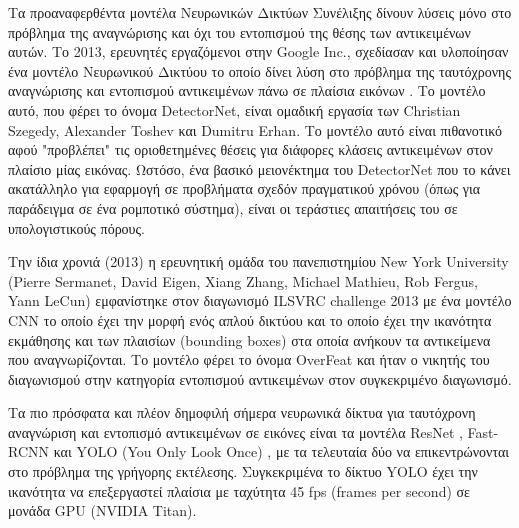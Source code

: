 Τα προαναφερθέντα μοντέλα Νευρωνικών Δικτύων Συνέλιξης δίνουν
λύσεις μόνο στο πρόβλημα της αναγνώρισης και όχι
του εντοπισμού της θέσης των αντικειμένων αυτών.
Το 2013, ερευνητές εργαζόμενοι στην Google Inc., σχεδίασαν και υλοποίησαν ένα
μοντέλο Νευρωνικού Δικτύου το οποίο δίνει λύση στο πρόβλημα της ταυτόχρονης
αναγνώρισης και εντοπισμού αντικειμένων πάνω σε πλαίσια εικόνων \cite{szegedy2013deep}.
Το μοντέλο αυτό, που φέρει το όνομα DetectorNet, είναι ομαδική εργασία των
Christian Szegedy, Alexander Toshev και Dumitru Erhan. Το μοντέλο αυτό είναι
πιθανοτικό αφού "προβλέπει" τις οριοθετημένες θέσεις για διάφορες κλάσεις
αντικειμένων στον πλαίσιο μίας εικόνας. Ωστόσο, ένα βασικό μειονέκτημα του DetectorNet
που το κάνει ακατάλληλο για εφαρμογή σε προβλήματα σχεδόν πραγματικού χρόνου (όπως
για παράδειγμα σε ένα ρομποτικό σύστημα), είναι οι τεράστιες απαιτήσεις του σε
υπολογιστικούς πόρους.

Την ίδια χρονιά (2013) η ερευνητική ομάδα του πανεπιστημίου New York University
(Pierre Sermanet, David Eigen, Xiang Zhang, Michael Mathieu, Rob Fergus, Yann LeCun)
εμφανίστηκε στον διαγωνισμό ILSVRC challenge 2013 με ένα μοντέλο CNN το οποίο
έχει την μορφή ενός απλού δικτύου και το οποίο έχει την ικανότητα εκμάθησης
και των πλαισίων (bounding boxes) στα οποία ανήκουν τα αντικείμενα που αναγνωρίζονται.
Το μοντέλο φέρει το όνομα OverFeat \cite{sermanet2013overfeat} και ήταν ο νικητής του διαγωνισμού στην
κατηγορία εντοπισμού αντικειμένων στον συγκεκριμένο διαγωνισμό.

Τα πιο πρόσφατα και πλέον δημοφιλή σήμερα νευρωνικά δίκτυα για ταυτόχρονη
αναγνώριση και εντοπισμό αντικειμένων σε εικόνες είναι τα μοντέλα
ResNet \cite{DBLP:journals/corr/HeZRS15}, Fast-RCNN \cite{DBLP:journals/corr/Girshick15}
και YOLO (You Only Look Once) \cite{DBLP:journals/corr/RedmonDGF15}, με τα
τελευταία δύο να επικεντρώνονται στο πρόβλημα της γρήγορης εκτέλεσης.
Συγκεκριμένα το δίκτυο YOLO έχει την ικανότητα να επεξεργαστεί πλαίσια με
ταχύτητα 45 fps (frames per second) σε μονάδα GPU (NVIDIA Titan).

%
%
